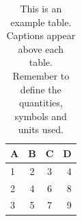 \documentclass[fleqn,usenatbib]{mnras}
\begin{document}
\begin{table}
	\centering
	\caption{This is an example table. Captions appear above each table.
	Remember to define the quantities, symbols and units used.}
	\label{tab:example_table}
	\begin{tabular}{lccr} %
		\hline
		A & B & C & D\\
		\hline
		1 & 2 & 3 & 4\\
		2 & 4 & 6 & 8\\
		3 & 5 & 7 & 9\\
		\hline
	\end{tabular}
\end{table}

\fi


\bsp	%
\label{lastpage}
\end{document}

